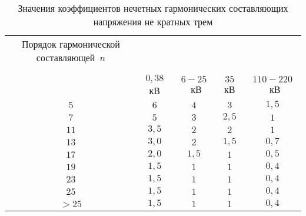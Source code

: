 \begin{table} [p]%
	\caption{Значения коэффициентов нечетных гармонических составляющих напряжения не кратных трем}%
	\label{tbl:test3}%
	\begin{SingleSpace}
		\setlength\extrarowheight{6pt} %
		\setlength{\tymin}{1.9cm}%
		\begin{tabulary}{\textwidth}{@{}>{\zz}C >{\zz}C >{\zz}C >{\zz}C >{\zz}C @{}}%
			\toprule     %
			Порядок гармонической составляющей~$n$ & 
			  \\
			&
			\\		
			&
			 \\			
			&
			$0,38$ кВ &
			$6-25$~кВ &
			$35$ кВ  &
			$110-220$~кВ \\
			\midrule %
			$5$ &
			$6$ &
			$4$ &
			$3$ &
			$1,5$ \\
			
			$7$ &
			$5$ &
			$3$ &
			$2,5$&
			$1$ \\
			
			$11$ &
			$3,5$ &
			$2$ &
			$2$ &
			$1$ \\
			
			$13$ &
			$3,0$ &
			$2$ &
			$1,5$ &
			$0,7$\\
			
			$17$ &
			$2,0$ &
			$1,5$ &
			$1$ &
			$0,5$\\
			
			$19$ &
			$1,5$ &
			$1$	&
			$1$ &
			$0,4$\\
			
			$23$ &
			$1,5$ &
			$1$ &
			$1$ &
			$0,4$\\
			
			$25$ &
			$1,5$ &
			$1$ &
			$1$ &
			$0,4$\\
			
			$>25$ &
			$1,5$ &
			$1$ &
			$1$ &
			$0,4$\\
			
			\bottomrule %
		\end{tabulary}%
	\end{SingleSpace}
\end{table}

